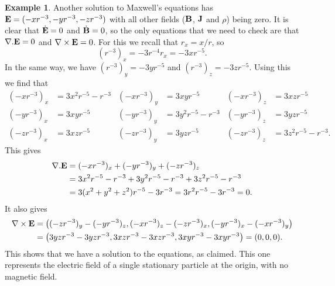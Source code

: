 \documentclass[reqno]{amsart}
\theoremstyle{definition}
\newtheorem{example}[theorem]{Example}
\begin{document}
\begin{example}\label{eg-point-charge-maxwell}
 Another solution to Maxwell's equations has
 $\mathbf{E}=(-xr^{-3},-yr^{-3},-zr^{-3})$ with all other fields ($\mathbf{B}$,
 $\mathbf{J}$ and $\rho$) being zero.  It is clear that $\dot{\mathbf{E}}=0$ and
 $\dot{\mathbf{B}}=0$, so the only equations that we need to check are that
 $\nabla.\mathbf{E}=0$ and $\nabla\times\mathbf{E}=0$.  For this we recall that
 $r_x=x/r$, so 
 \[ (r^{-3})_x = -3r^{-4}r_x = -3xr^{-5}. \]
 In the same way, we have $(r^{-3})_y=-3yr^{-5}$ and
 $(r^{-3})_z=-3zr^{-5}$.  Using this we find that
 \begin{align*}
  (-xr^{-3})_x &= 3x^2r^{-5}-r^{-3} & 
  (-xr^{-3})_y &= 3xyr^{-5} & 
  (-xr^{-3})_z &= 3xzr^{-5} \\
  (-yr^{-3})_x &= 3xyr^{-5} & 
  (-yr^{-3})_y &= 3y^2r^{-5}-r^{-3} & 
  (-yr^{-3})_z &= 3yzr^{-5} \\
  (-zr^{-3})_x &= 3xzr^{-5} & 
  (-zr^{-3})_y &= 3yzr^{-5} & 
  (-zr^{-3})_z &= 3z^2r^{-5}-r^{-3}.
 \end{align*}
 This gives
 \begin{align*}
  \nabla.\mathbf{E} &= (-xr^{-3})_x + (-yr^{-3})_y + (-zr^{-3})_z \\
   &= 3x^2r^{-5}-r^{-3}+3y^2r^{-5}-r^{-3}+3z^2r^{-5}-r^{-3} \\
   &= 3(x^2+y^2+z^2)r^{-5}-3r^{-3} = 3r^2r^{-5}-3r^{-3} = 0.
 \end{align*}
 It also gives
 \begin{align*}
  \nabla\times\mathbf{E} &= 
   \left(
    (-zr^{-3})_y-(-yr^{-3})_z,
    (-xr^{-3})_z-(-zr^{-3})_x,
    (-yr^{-3})_x-(-xr^{-3})_y
   \right) \\
   &= \left(3yzr^{-3}-3yzr^{-3},3xzr^{-3}-3xzr^{-3},3xyr^{-3}-3xyr^{-3}\right)
    = (0,0,0).
 \end{align*}
 This shows that we have a solution to the equations, as claimed.
 This one represents the electric field of a single stationary
 particle at the origin, with no magnetic field.
\end{example}
\end{document}
